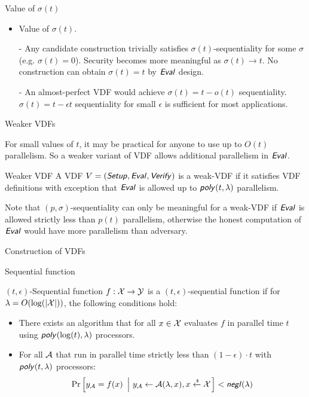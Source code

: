 \documentclass[UTF8]{beamer}
\begin{document}
	\begin{frame}{Value of $\sigma(t)$}
		\begin{itemize}
			\item Value of $\sigma(t)$.
			\item [-] Any candidate construction trivially satisfies $\sigma(t)$-sequentiality for some $\sigma$ (e.g. $\sigma(t)=0$). Security becomes more meaningful as $\sigma(t)\to t$. No construction can obtain $\sigma(t)=t$ by $\textsf{\textit{Eval}}$ design.
			\item [-] An almost-perfect VDF would achieve $\sigma(t)=t-o(t)$ sequentiality. $\sigma(t)=t-\epsilon t$ sequentiality for small $\epsilon$ is sufficient for most applications.
		\end{itemize}
	\end{frame}

	\begin{frame}{Weaker VDFs}
		\begin{block}{}
			For small values of $t$, it may be practical for anyone to use up to $O(t)$ parallelism. So a weaker variant of VDF allows additional parallelism in $\textsf{\textit{Eval}}$.
		\end{block}
		\begin{block}{Weaker VDF}
			A VDF $V=(\textsf{\textit{Setup}},\textsf{\textit{Eval}},\textsf{\textit{Verify}})$ is a weak-VDF if it satisfies VDF definitions with exception that $\textsf{\textit{Eval}}$ is allowed up to $\textsf{\textit{poly}}(t,\lambda)$ parallelism.
		\end{block}
		\begin{block}{}
			Note that $(p,\sigma)$-sequentiality can only be meaningful for a weak-VDF if $\textsf{\textit{Eval}}$ is allowed strictly less than $p(t)$ parallelism, otherwise the honest computation of $\textsf{\textit{Eval}}$ would have more parallelism than adversary.
		\end{block}
	\end{frame}

	\begin{frame}
		\centering
		\huge Construction of VDFs
	\end{frame}

	\begin{frame}{Sequential function}
		\begin{block}{$(t,\epsilon)$-Sequential function}
			$f:\mathcal{X}\to\mathcal{Y}$ is a $(t,\epsilon)$-sequential function if for $\lambda=O(\log(|\mathcal{X}|))$, the following conditions hold:
			\begin{itemize}
				\item There exists an algorithm that for all $x\in\mathcal{X}$ evaluates $f$ in parallel time $t$ using $\textsf{\textit{poly}}(\log(t),\lambda)$ processors.
				\item For all $\mathcal{A}$ that run in parallel time strictly less than $(1-\epsilon)\cdot t$ with $\textsf{\textit{poly}}(t,\lambda)$ processors:
				\begin{equation*}
					\Pr\left[
					y_{\mathcal{A}}=f(x)
					~\left|~
					y_{\mathcal{A}}\gets\mathcal{A}(\lambda,x), x\xleftarrow{\text{\tiny$\mathsf{\$}$}}\mathcal{X}
					\right.\right]<\textsf{\textit{negl}}(\lambda)
				\end{equation*}
			\end{itemize}
		\end{block}
	\end{frame}
\end{document}
